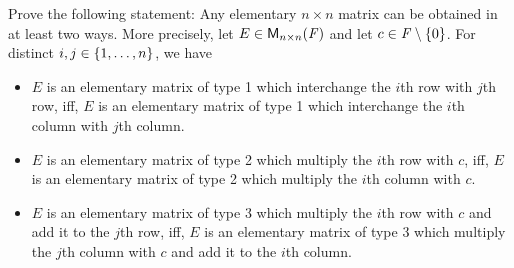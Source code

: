 \exercisesection

\setcounter{ex}{3}
\begin{ex}\label{ex:3.1.4}
	Prove the following statement:
	Any elementary \(n \times n\) matrix can be obtained in at least two ways.
	More precisely, let \(E \in \ms[n][n][\F]\) and let \(c \in \mathit{F} \setminus \left\lbrace0\right\rbrace\).
	For distinct \(i, j \in \left\lbrace1, \dots, n\right\rbrace\), we have
	\begin{itemize}
		\item \(E\) is an elementary matrix of type 1 which interchange the \(i\)th row with \(j\)th row, iff, \(E\) is an elementary matrix of type 1 which interchange the \(i\)th column with \(j\)th column.
		\item \(E\) is an elementary matrix of type 2 which multiply the \(i\)th row with \(c\), iff, \(E\) is an elementary matrix of type 2 which multiply the \(i\)th column with \(c\).
		\item \(E\) is an elementary matrix of type 3 which multiply the \(i\)th row with \(c\) and add it to the \(j\)th row, iff, \(E\) is an elementary matrix of type 3 which multiply the \(j\)th column with \(c\) and add it to the \(i\)th column.
	\end{itemize}
\end{ex}


